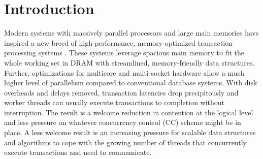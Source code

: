 
\section{Introduction}

Modern systems with massively parallel processors and large main memories have inspired a new breed of high-performance, memory-optimized transaction processing systems \cite{Kallman+08,PandisJHA10,KemperN11,LarsonBDFPZ11,LevandoskiLSSW15,TuZKLM13}. These systems leverage spacious main memory to fit the whole working set in DRAM with streamlined, memory-friendly data structures. Further, optimizations for multicore and multi-socket hardware allow a much higher level of parallelism compared to conventional database systems. With disk overheads and delays removed, transaction latencies drop precipitously and worker threads can usually execute transactions to completion without interruption. The result is a welcome reduction in contention at the logical level and less pressure on whatever concurrency control (CC) scheme might be in place. A less welcome result is an increasing pressure for scalable data structures and algorithms to cope with the growing number of threads that concurrently execute transactions and need to communicate.


